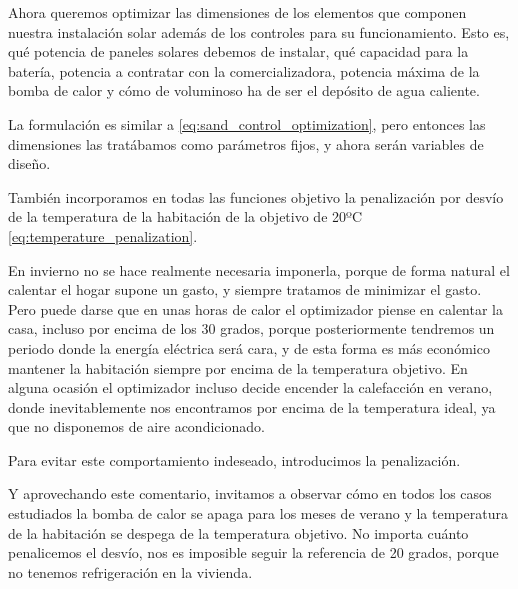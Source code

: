 Ahora queremos optimizar las dimensiones de los elementos que componen nuestra
instalación solar además de los controles para su funcionamiento. Esto es, qué
potencia de paneles solares debemos de instalar, qué capacidad para la batería,
potencia a contratar con la comercializadora, potencia máxima de la bomba de
calor y cómo de voluminoso ha de ser el depósito de agua caliente.

La formulación es similar a \eqref{eq:sand_control_optimization}, pero entonces
las dimensiones las tratábamos como parámetros fijos, y ahora serán variables
de diseño.

También incorporamos en todas las funciones objetivo la penalización por desvío
de la temperatura de la habitación de la objetivo de 20ºC
\eqref{eq:temperature_penalization}.

En invierno no se hace realmente necesaria imponerla, porque de forma natural
el calentar el hogar supone un gasto, y siempre tratamos de minimizar el gasto.
Pero puede darse que en unas horas de calor el optimizador piense en calentar
la casa, incluso por encima de los 30 grados, porque posteriormente tendremos
un periodo donde la energía eléctrica será cara, y de esta forma es más
económico mantener la habitación siempre por encima de la temperatura objetivo.
En alguna ocasión el optimizador incluso decide encender la calefacción en
verano, donde inevitablemente nos encontramos por encima de la temperatura
ideal, ya que no disponemos de aire acondicionado.

Para evitar este comportamiento indeseado, introducimos la penalización.

Y aprovechando este comentario, invitamos a observar cómo en todos los casos
estudiados la bomba de calor se apaga para los meses de verano y la temperatura
de la habitación se despega de la temperatura objetivo. No importa cuánto
penalicemos el desvío, nos es imposible seguir la referencia de 20 grados,
porque no tenemos refrigeración en la vivienda.

